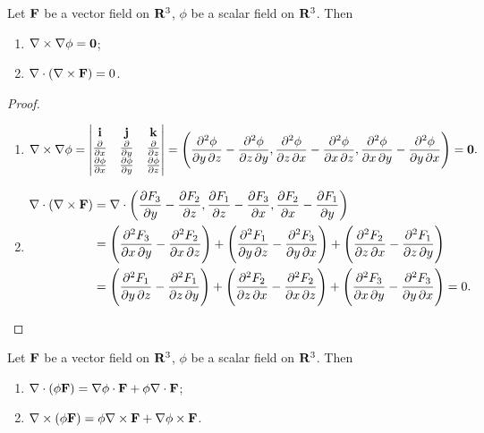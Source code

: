 \begin{proposition}
Let $\mathbf F$ be a vector field on $\mathbf R^3$, $\phi$ be a scalar field on $\mathbf R^3$. Then
\begin{enumerate}[label=(\roman*)]
\item $\nabla\times\nabla\phi=\vb{0}$;
\item $\nabla\cdot(\nabla\times\vb{F})=0$.
\end{enumerate}
\end{proposition}

\begin{proof} \
\begin{enumerate}[label=(\roman*)]
\item \[\nabla\times\nabla\phi
=\begin{vmatrix}
\vb{i}&\vb{j}&\vb{k}\\
\pdv{}{x}&\pdv{}{y}&\pdv{}{z}\\
\pdv{\phi}{x}&\pdv{\phi}{y}&\pdv{\phi}{z}
\end{vmatrix}=\left(\pdv{\phi}{y,z}-\pdv{\phi}{z,y},\pdv{\phi}{z,x}-\pdv{\phi}{x,z},\pdv{\phi}{x,y}-\pdv{\phi}{y,x}\right)=\vb{0}.\]

\item \begin{align*}
\nabla\cdot(\nabla\times\vb{F})
&=\nabla\cdot\left(\pdv{F_3}{y}-\pdv{F_2}{z},\pdv{F_1}{z}-\pdv{F_3}{x},\pdv{F_2}{x}-\pdv{F_1}{y}\right)\\
&=\left(\pdv{F_3}{x,y}-\pdv{F_2}{x,z}\right)+\left(\pdv{F_1}{y,z}-\pdv{F_3}{y,x}\right)+\left(\pdv{F_2}{z,x}-\pdv{F_1}{z,y}\right)\\
&=\left(\pdv{F_1}{y,z}-\pdv{F_1}{z,y}\right)+\left(\pdv{F_2}{z,x}-\pdv{F_2}{x,z}\right)+\left(\pdv{F_3}{x,y}-\pdv{F_3}{y,x}\right)=0.
\end{align*}
\end{enumerate}
\end{proof}

\begin{proposition}
Let $\vb{F}$ be a vector field on $\mathbf R^3$, $\phi$ be a scalar field on $\mathbf R^3$. Then
\begin{enumerate}[label=(\roman*)]
\item $\nabla\cdot(\phi\vb{F})=\nabla\phi\cdot\vb{F}+\phi\nabla\cdot\vb{F}$;
\item $\nabla\times(\phi\vb{F})=\phi\nabla\times\vb{F}+\nabla\phi\times\vb{F}$.
\end{enumerate}
\end{proposition}


